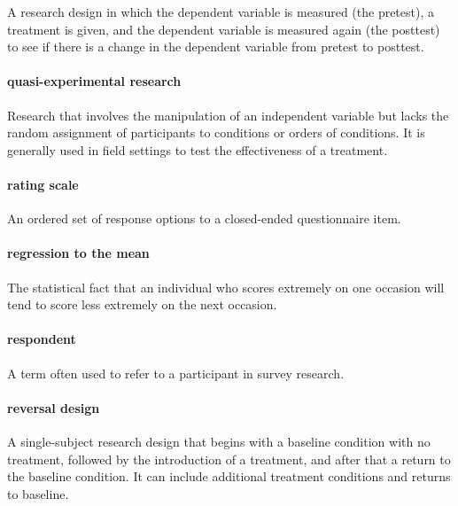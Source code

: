 \documentclass[
]{krantz}
\begin{document}
A research design in which the dependent variable is measured (the pretest), a treatment is given, and the dependent variable is measured again (the posttest) to see if there is a change in the dependent variable from pretest to posttest.

\paragraph*{quasi-experimental research}\label{quasi-experimental-research-1}

Research that involves the manipulation of an independent variable but lacks the random assignment of participants to conditions or orders of conditions. It is generally used in field settings to test the effectiveness of a treatment.

\paragraph*{rating scale}\label{rating-scale}

An ordered set of response options to a closed-ended questionnaire item.

\paragraph*{regression to the mean}\label{regression-to-the-mean}

The statistical fact that an individual who scores extremely on one occasion will tend to score less extremely on the next occasion.

\paragraph*{respondent}\label{respondent}

A term often used to refer to a participant in survey research.

\paragraph*{reversal design}\label{reversal-design}

A single-subject research design that begins with a baseline condition with no treatment, followed by the introduction of a treatment, and after that a return to the baseline condition. It can include additional treatment conditions and returns to baseline.
\end{document}
